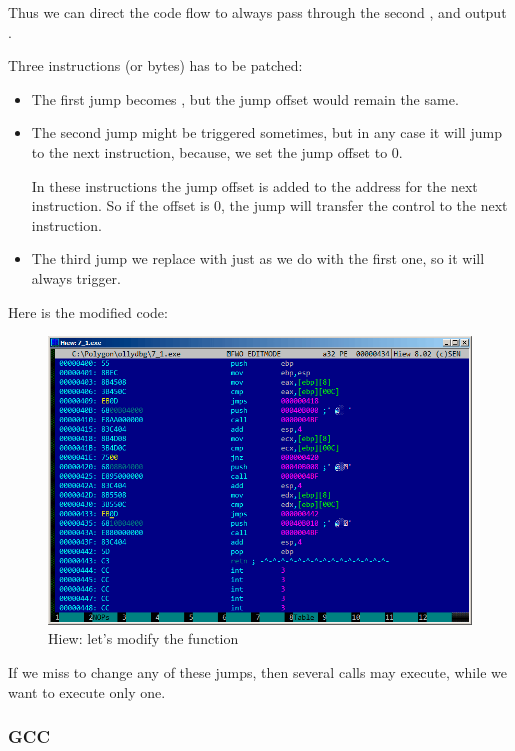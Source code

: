 Thus we can direct the code flow to always pass through the second \printf, and output .

Three instructions (or bytes) has to be patched:

\begin{itemize}
\item The first jump becomes \JMP, but the \gls{jump offset} would remain the same.

\item 
The second jump might be triggered sometimes, but in any case it will jump to the next
instruction, because, we set the \gls{jump offset} to 0.

In these instructions the \gls{jump offset} is added to the address for the next instruction.
So if the offset is 0,
the jump will transfer the control to the next instruction.

\item 
The third jump we replace with \JMP just as we do with the first one, so it will always trigger.

\end{itemize}

\clearpage
Here is the modified code:

\begin{figure}[H]
\centering
\includegraphics[scale=\FigScale]{patterns/07_jcc/simple/hiew_unsigned2.png}
\caption{Hiew: let's modify the  function}
\label{fig:jcc_hiew_2}
\end{figure}

If we miss to change any of these jumps, then several \printf calls may execute, while we want to execute only one.

\subsubsection{\NonOptimizing GCC}

